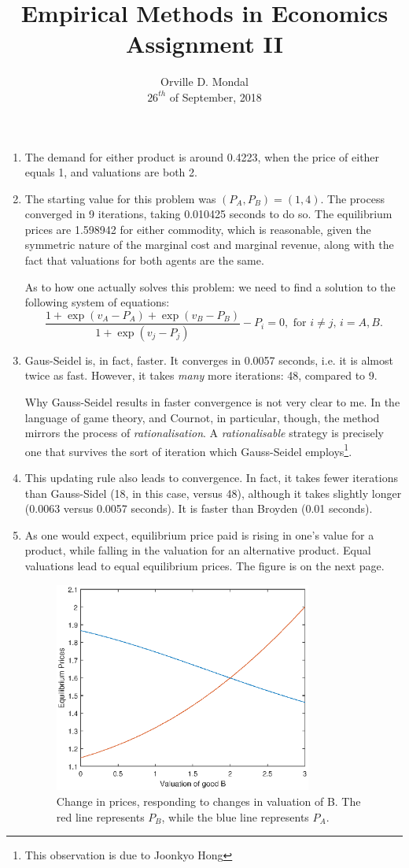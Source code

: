 \documentclass[12pt,a4paper]{article}
\title{Empirical Methods in Economics\\\small{Assignment II}}
\date{Orville D. Mondal\\ $26^{th}$ of September, 2018\vspace{-3ex}}
\begin{document}
\maketitle
\begin{enumerate}
\item The demand for either product is around 0.4223, when the price of either equals 1, and valuations are both 2.
\item The starting value for this problem was $(P_{A},P_{B})=(1,4)$. The process converged in 9 iterations, taking 0.010425 seconds to do so. The equilibrium prices are 1.598942 for either commodity, which is reasonable, given the symmetric nature of the marginal cost and marginal revenue, along with the fact that valuations for both agents are the same.\par As to how one actually solves this problem: we need to find a solution to the following system of equations:
    \[\frac{1+\exp(v_{A}-P_{A})+\exp(v_{B}-P_{B})}{1+\exp(v_{j}-P_{j})}-P_{i}=0,\text{ for $i\neq j$, $i=A,B$.}\]
\item Gaus-Seidel is, in fact, faster. It converges in 0.0057 seconds, i.e. it is almost twice as fast. However, it takes \emph{many} more iterations: 48, compared to 9.\par Why Gauss-Seidel results in faster convergence is not very clear to me. In the language of game theory, and Cournot, in particular, though, the method mirrors the process of \emph{rationalisation}. A \emph{rationalisable} strategy is precisely one that survives the sort of iteration which Gauss-Seidel employs\footnote{This observation is due to Joonkyo Hong}.
\item This updating rule also leads to convergence. In fact, it takes fewer iterations than Gauss-Sidel (18, in this case, versus 48), although it takes slightly longer (0.0063 versus 0.0057 seconds). It is faster than Broyden (0.01 seconds).
\item As one would expect, equilibrium price paid is rising in one's value for a product, while falling in the valuation for an alternative product. Equal valuations lead to equal equilibrium prices. The figure is on the next page.\newpage
\begin{figure}
\centering
\includegraphics[width=0.8\textwidth]{fig1.eps}
\caption{Change in prices, responding to changes in valuation of B. The red line represents $P_{B}$, while the blue line represents $P_{A}.$}
\end{figure}
\end{enumerate}
\end{document}
